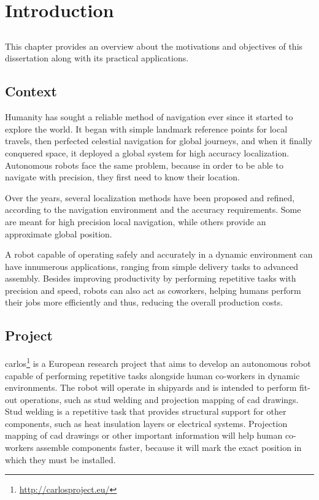 \chapter{Introduction} \label{chap:introduction}



\section*{}

This chapter provides an overview about the motivations and objectives of this dissertation along with its practical applications.



\section{Context}\label{sec:introduction_context}

Humanity has sought a reliable method of navigation ever since it started to explore the world. It began with simple landmark reference points for local travels, then perfected celestial navigation for global journeys, and when it finally conquered space, it deployed a global system for high accuracy localization. Autonomous robots face the same problem, because in order to be able to navigate with precision, they first need to know their location.

Over the years, several localization methods have been proposed and refined, according to the navigation environment and the accuracy requirements. Some are meant for high precision local navigation, while others provide an approximate global position.

A robot capable of operating safely and accurately in a dynamic environment can have innumerous applications, ranging from simple delivery tasks to advanced assembly. Besides improving productivity by performing repetitive tasks with precision and speed, robots can also act as coworkers, helping humans perform their jobs more efficiently and thus, reducing the overall production costs.



\section{Project}\label{sec:introduction_project}

\gls{carlos}\footnote{\url{http://carlosproject.eu/}} is a European research project that aims to develop an autonomous robot capable of performing repetitive tasks alongside human co-workers in dynamic environments. The robot will operate in shipyards and is intended to perform fit-out operations, such as stud welding and projection mapping of \gls{cad} drawings. Stud welding is a repetitive task that provides structural support for other components, such as heat insulation layers or electrical systems. Projection mapping of \gls{cad} drawings or other important information will help human co-workers assemble components faster, because it will mark the exact position in which they must be installed.



